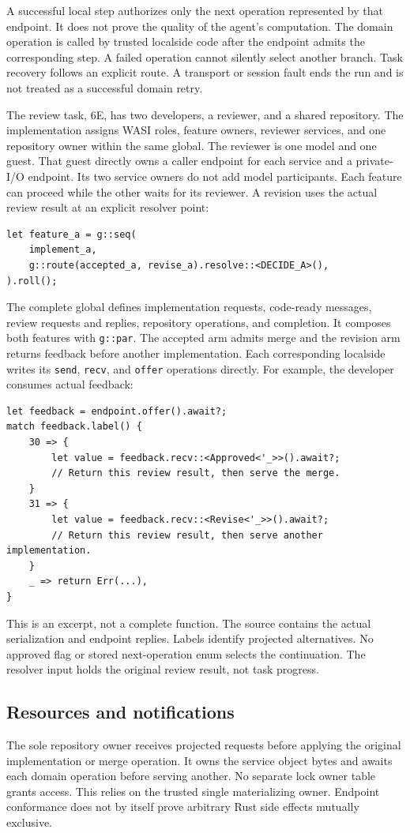 \documentclass[10pt]{article}
\begin{document}
A successful local step authorizes only the next operation represented by that
endpoint. It does not prove the quality of the agent's computation. The domain
operation is called by trusted localside code after the endpoint admits the
corresponding step. A failed operation cannot silently select another branch.
Task recovery follows an explicit route. A transport or session fault ends the
run and is not treated as a successful domain retry.

The review task, 6E, has two developers, a reviewer, and a shared repository.
The implementation assigns WASI roles, feature owners, reviewer services, and
one repository owner within the same global. The reviewer is one model and
one guest. That guest directly owns a caller endpoint for each service and a
private-I/O endpoint. Its two service owners do not add model participants.
Each feature can proceed while the other waits for its reviewer. A revision
uses the actual review result at an explicit resolver point:
\begin{lstlisting}
let feature_a = g::seq(
    implement_a,
    g::route(accepted_a, revise_a).resolve::<DECIDE_A>(),
).roll();
\end{lstlisting}
The complete global defines implementation requests, code-ready messages,
review requests and replies, repository operations, and completion. It composes
both features with \texttt{g::par}. The accepted arm admits merge and the
revision arm returns feedback before another implementation. Each corresponding
localside writes its \texttt{send}, \texttt{recv}, and \texttt{offer} operations
directly. For example, the developer consumes actual feedback:
\begin{lstlisting}
let feedback = endpoint.offer().await?;
match feedback.label() {
    30 => {
        let value = feedback.recv::<Approved<'_>>().await?;
        // Return this review result, then serve the merge.
    }
    31 => {
        let value = feedback.recv::<Revise<'_>>().await?;
        // Return this review result, then serve another implementation.
    }
    _ => return Err(...),
}
\end{lstlisting}
This is an excerpt, not a complete function. The source contains the actual
serialization and endpoint replies. Labels identify projected alternatives.
No approved flag or stored next-operation enum selects the continuation.
The resolver input holds the original review result, not task progress.

\subsection{Resources and notifications}
The sole repository owner receives projected requests before applying the
original implementation or merge operation. It owns the service object bytes
and awaits each domain operation before serving another. No separate lock
owner table grants access. This relies on the trusted single materializing
owner. Endpoint conformance does not by itself prove arbitrary Rust side
effects mutually exclusive.
\end{document}
